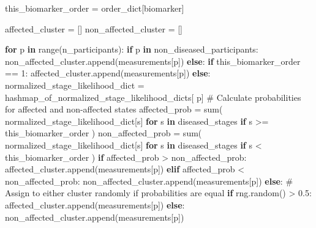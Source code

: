 \documentclass[
  letterpaper,
  DIV=11,
  numbers=noendperiod]{scrreprt}
\newenvironment{Shaded}{\begin{snugshade}}{\end{snugshade}}
\newcommand{\BuiltInTok}[1]{\textcolor[rgb]{0.00,0.23,0.31}{#1}}
\newcommand{\CommentTok}[1]{\textcolor[rgb]{0.37,0.37,0.37}{#1}}
\newcommand{\ControlFlowTok}[1]{\textcolor[rgb]{0.00,0.23,0.31}{\textbf{#1}}}
\newcommand{\DecValTok}[1]{\textcolor[rgb]{0.68,0.00,0.00}{#1}}
\newcommand{\FloatTok}[1]{\textcolor[rgb]{0.68,0.00,0.00}{#1}}
\newcommand{\KeywordTok}[1]{\textcolor[rgb]{0.00,0.23,0.31}{\textbf{#1}}}
\newcommand{\NormalTok}[1]{\textcolor[rgb]{0.00,0.23,0.31}{#1}}
\newcommand{\OperatorTok}[1]{\textcolor[rgb]{0.37,0.37,0.37}{#1}}
\begin{document}
\begin{Shaded}
\begin{Highlighting}[]
\NormalTok{    this\_biomarker\_order }\OperatorTok{=}\NormalTok{ order\_dict[biomarker]}

\NormalTok{    affected\_cluster }\OperatorTok{=}\NormalTok{ []}
\NormalTok{    non\_affected\_cluster }\OperatorTok{=}\NormalTok{ []}

    \ControlFlowTok{for}\NormalTok{ p }\KeywordTok{in} \BuiltInTok{range}\NormalTok{(n\_participants):}
        \ControlFlowTok{if}\NormalTok{ p }\KeywordTok{in}\NormalTok{ non\_diseased\_participants:}
\NormalTok{            non\_affected\_cluster.append(measurements[p])}
        \ControlFlowTok{else}\NormalTok{:}
            \ControlFlowTok{if}\NormalTok{ this\_biomarker\_order }\OperatorTok{==} \DecValTok{1}\NormalTok{:}
\NormalTok{                affected\_cluster.append(measurements[p])}
            \ControlFlowTok{else}\NormalTok{:}
\NormalTok{                normalized\_stage\_likelihood\_dict }\OperatorTok{=}\NormalTok{ hashmap\_of\_normalized\_stage\_likelihood\_dicts[}
\NormalTok{                    p]}
                \CommentTok{\# Calculate probabilities for affected and non{-}affected states}
\NormalTok{                affected\_prob }\OperatorTok{=} \BuiltInTok{sum}\NormalTok{(}
\NormalTok{                    normalized\_stage\_likelihood\_dict[s] }\ControlFlowTok{for}\NormalTok{ s }\KeywordTok{in}\NormalTok{ diseased\_stages }\ControlFlowTok{if}\NormalTok{ s }\OperatorTok{\textgreater{}=}\NormalTok{ this\_biomarker\_order}
\NormalTok{                )}
\NormalTok{                non\_affected\_prob }\OperatorTok{=} \BuiltInTok{sum}\NormalTok{(}
\NormalTok{                    normalized\_stage\_likelihood\_dict[s] }\ControlFlowTok{for}\NormalTok{ s }\KeywordTok{in}\NormalTok{ diseased\_stages }\ControlFlowTok{if}\NormalTok{ s }\OperatorTok{\textless{}}\NormalTok{ this\_biomarker\_order}
\NormalTok{                )}
                \ControlFlowTok{if}\NormalTok{ affected\_prob }\OperatorTok{\textgreater{}}\NormalTok{ non\_affected\_prob:}
\NormalTok{                    affected\_cluster.append(measurements[p])}
                \ControlFlowTok{elif}\NormalTok{ affected\_prob }\OperatorTok{\textless{}}\NormalTok{ non\_affected\_prob:}
\NormalTok{                    non\_affected\_cluster.append(measurements[p])}
                \ControlFlowTok{else}\NormalTok{:}
                    \CommentTok{\# Assign to either cluster randomly if probabilities are equal}
                    \ControlFlowTok{if}\NormalTok{ rng.random() }\OperatorTok{\textgreater{}} \FloatTok{0.5}\NormalTok{:}
\NormalTok{                        affected\_cluster.append(measurements[p])}
                    \ControlFlowTok{else}\NormalTok{:}
\NormalTok{                        non\_affected\_cluster.append(measurements[p])}


\end{Highlighting}
\end{Shaded}
\end{document}
